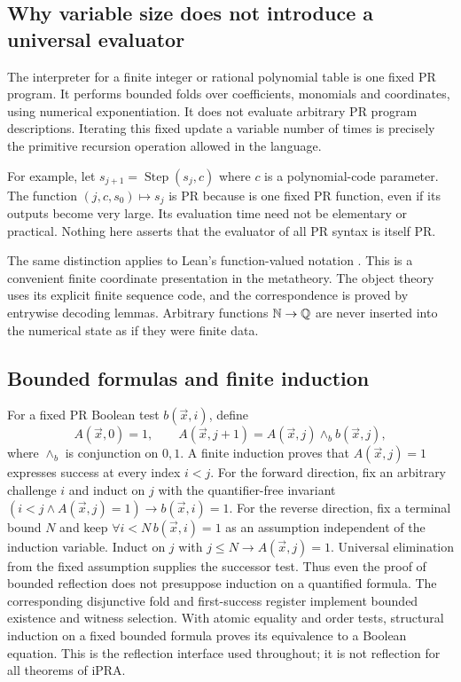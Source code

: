 \subsection{Why variable size does not introduce a universal evaluator}

The interpreter for a finite integer or rational polynomial table is one
fixed PR program. It performs bounded folds over coefficients, monomials
and coordinates, using numerical exponentiation. It does not evaluate
arbitrary PR program descriptions. Iterating this fixed update a variable
number of times is precisely the primitive recursion operation allowed
in the language.

For example, let $s_{j+1}=\operatorname{Step}(s_j,c)$ where $c$ is a
polynomial-code parameter. The function $(j,c,s_0)\mapsto s_j$ is PR
because  is one fixed PR function, even if its outputs become
very large. Its evaluation time need not be elementary or practical.
Nothing here asserts that the evaluator of all PR syntax is itself PR.

The same distinction applies to Lean's function-valued notation
. This is a convenient finite coordinate presentation
in the metatheory. The object theory uses its explicit finite sequence
code, and the correspondence is proved by entrywise decoding lemmas.
Arbitrary functions $\mathbb N\to\mathbb Q$ are never inserted into the numerical
state as if they were finite data.

\subsection{Bounded formulas and finite induction}

For a fixed PR Boolean test $b(\vec x,i)$, define
\[
 A(\vec x,0)=1,\qquad
 A(\vec x,j+1)=A(\vec x,j)\mathbin{\wedge_b}b(\vec x,j),
\]
where $\wedge_b$ is conjunction on $0,1$. A finite induction
proves that $A(\vec x,j)=1$ expresses success at every index $i<j$.
For the forward direction, fix an arbitrary challenge $i$ and induct on
$j$ with the quantifier-free invariant
$(i<j\land A(\vec x,j)=1)\to b(\vec x,i)=1$.
For the reverse direction, fix a terminal bound $N$ and keep
$\forall i<N\,b(\vec x,i)=1$ as an assumption independent of the
induction variable. Induct on $j$ with
$j\le N\to A(\vec x,j)=1$. Universal elimination from the fixed
assumption supplies the successor test. Thus even the proof of bounded
reflection does not presuppose induction on a quantified formula.
The corresponding disjunctive fold and first-success register implement
bounded existence and witness selection. With atomic equality and order
tests, structural induction on a fixed bounded formula proves its
equivalence to a Boolean equation. This is the reflection interface used
throughout; it is not reflection for all theorems of iPRA.

